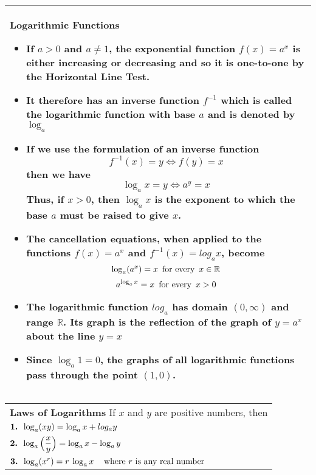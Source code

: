 \documentclass[fleqn]{article}
\begin{document}
\begin{center}
\def\arraystretch{1.3}
{\setlength{\tabcolsep}{16pt}
\begin{tabularx}{.9\textwidth}{|X|}
\hline
	\vspace{1pt}
	\textbf{Logarithmic Functions}
	\begin{itemize}
	\item If $a>0$ and $a \ne 1$, the exponential function $f(x) = a^x$ is either increasing or decreasing and so it is one-to-one by the Horizontal Line Test.  
	\item It therefore has an inverse function $f^{-1}$ which is called the \textbf{logarithmic function with base $a$} and is denoted by $\log_a$
	\item If we use the formulation of an inverse function
	$$f^{-1}(x) = y \Leftrightarrow f(y) = x$$
	then we have
	$$\log_ax = y \Leftrightarrow a^y = x$$
	Thus, if $x>0$, then $\log_ax$ is the exponent to which the base $a$ must be raised to give $x$.
	\item The cancellation equations, when applied to the functions $f(x) = a^x$ and $f^{-1}(x) = log_ax$, become
	$$\log_a(a^x) = x \text{\hspace{5pt}for every\hspace{5pt}} x \in \mathbb{R}$$
	$$a^{\log_ax} = x \text{\hspace{5pt}for every\hspace{5pt}} x > 0$$
	\item The logarithmic function $log_a$ has domain $(0, \infty)$ and range $\mathbb{R}$. Its graph is the reflection of the graph of $y = a^x$ about the line $y = x$
	\item Since $\log_a 1 = 0$, the graphs of all logarithmic functions pass through the point $(1,0)$.
	\end{itemize}
	\\[6pt]
\hline
\end{tabularx}}
\vspace{12pt}

\def\arraystretch{1.3}
{\setlength{\tabcolsep}{16pt}
\begin{tabularx}{.9\textwidth}{|X|}
\hline
	\vspace{1pt}
	\textbf{Laws of Logarithms} \:\: If $x$ and $y$ are positive numbers, then \\[10pt]
	$\text{\textbf{1. }} \log_a(xy) = \log_ax + log_ay$ \\[10pt]
	$\text{\textbf{2. }} \log_a \Big( \dfrac{x}{y} \Big) = \log_ax - \log_ay$ \\[10pt]
	$\text{\textbf{3. }} \log_a(x^r) = r \: \log_ax \hspace{12pt} \text{where $r$ is any real number}$
	\\[18pt]
\hline
\end{tabularx}}
\vspace{12pt}


\end{center}
\end{document}
